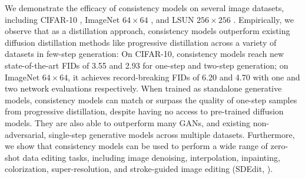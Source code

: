 We demonstrate the efficacy of consistency models on several image datasets, including CIFAR-10 \cite{krizhevsky2009learning}, ImageNet $64\times 64$ \cite{deng2009imagenet}, and LSUN $256\times 256$ \cite{yu2015lsun}. Empirically, we observe that as a distillation approach, consistency models outperform existing diffusion distillation methods like progressive distillation \cite{salimans2022progressive} across a variety of datasets in few-step generation: On CIFAR-10, consistency models reach new state-of-the-art FIDs of 3.55 and 2.93 for one-step and two-step generation; on ImageNet $64\times 64$, it achieves record-breaking FIDs of 6.20 and 4.70 with one and two network evaluations respectively. When trained as standalone generative models, consistency models can match or surpass the quality of one-step samples from progressive distillation, despite having no access to pre-trained diffusion models. They are also able to outperform many GANs, and existing non-adversarial, single-step generative models across multiple datasets. Furthermore, we show that consistency models can be used to perform a wide range of zero-shot data editing tasks, including image denoising, interpolation, inpainting, colorization, super-resolution, and stroke-guided image editing (SDEdit, \citet{meng2021sdedit}).




